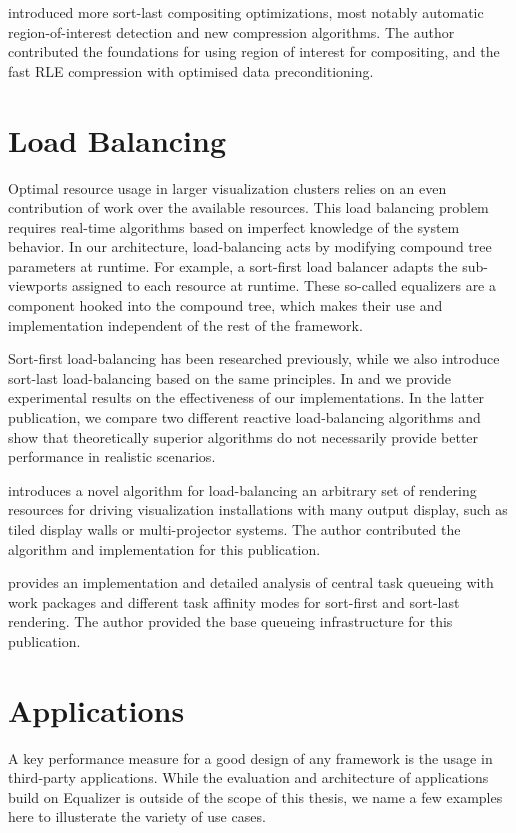 \cite{MEP:10} introduced more sort-last compositing optimizations, most notably
automatic region-of-interest detection and new compression algorithms. The
author contributed the foundations for using region of interest for compositing,
and the fast RLE compression with optimised data preconditioning.

\section{Load Balancing}

Optimal resource usage in larger visualization clusters relies on an even
contribution of work over the available resources. This load balancing problem
requires real-time algorithms based on imperfect knowledge of the system
behavior. In our architecture, load-balancing acts by modifying compound tree
parameters at runtime. For example, a sort-first load balancer adapts the
sub-viewports assigned to each resource at runtime. These so-called
\textsf{equalizers} are a component hooked into the compound tree, which makes
their use and implementation independent of the rest of the framework.

Sort-first load-balancing has been researched previously, while we also
introduce sort-last load-balancing based on the same principles. In
\cite{EMP:09} and \cite{ESP:18} we provide experimental results on the
effectiveness of our implementations. In the latter publication, we compare two
different reactive load-balancing algorithms and show that theoretically
superior algorithms do not necessarily provide better performance in realistic
scenarios.

\cite{EEP:11} introduces a novel algorithm for load-balancing an arbitrary set
of rendering resources for driving visualization installations with many output
display, such as tiled display walls or multi-projector systems. The author
contributed the algorithm and implementation for this publication.

\cite{SPEP:16} provides an implementation and detailed analysis of central task
queueing with work packages and different task affinity modes for sort-first and
sort-last rendering. The author provided the   base queueing infrastructure for
this publication.


\section{Applications}

A key performance measure for a good design of any framework is the usage in
third-party applications. While the evaluation and architecture of applications
build on Equalizer is outside of the scope of this thesis, we name a few
examples here to illusterate the variety of use cases.

